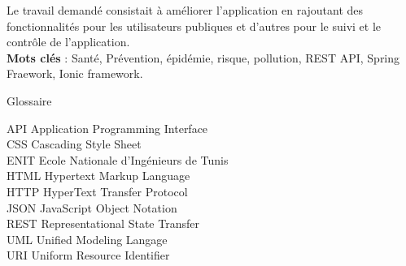 \documentclass[11pt,fleqn]{book} %
\begin{document}
	Le travail demandé consistait à améliorer l'application en rajoutant des fonctionnalités pour les utilisateurs publiques et d'autres pour le suivi et le contrôle de l'application.\\
	
	\textbf{Mots clés} : Santé, Prévention, épidémie, risque, pollution, REST API, Spring Fraework, Ionic framework.\\
	
	

	\newpage
	\vspace*{4cm}	
	{\LARGE Glossaire}
	
	\vspace*{1cm}
	\begin{flushleft}
		API Application Programming Interface\\
		CSS Cascading Style Sheet\\
		ENIT Ecole Nationale d’Ingénieurs de Tunis\\
		HTML Hypertext Markup Language\\
		HTTP HyperText Transfer Protocol\\
		JSON JavaScript Object Notation\\
		REST Representational State Transfer\\
		UML Unified Modeling Langage\\
		URI Uniform Resource Identifier\\
	\end{flushleft}

	\newpage
	\let\cleardoublepage\clearpage
	\renewcommand\listfigurename{Liste des figures}
	\listoffigures
	
	\newpage
	\let\cleardoublepage\clearpage
	\renewcommand\listtablename{Liste des tableaux} 
	\listoftables
		
	\newpage
	\let\cleardoublepage\clearpage
	\renewcommand\contentsname{Table des Matières}
	\tableofcontents
	
	

	
	\mainmatter
	
	
	
	
	
	
	
	
\end{document}
